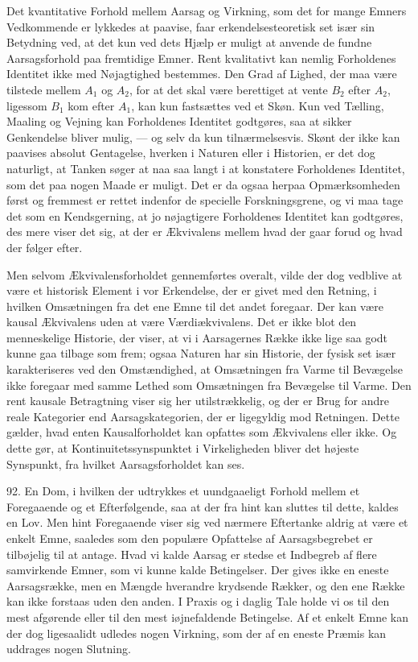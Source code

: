 \documentclass[12pt,a4paper]{book}
\newcommand{\apage}[1]{\marginnote{\footnotesize\textit{[#1]}}}
\begin{document}
Det kvantitative Forhold mellem Aarsag og Virkning, som det for mange Emners
Vedkommende er lykkedes at paavise, faar erkendelsesteoretisk set især sin
Betydning ved, at det kun ved dets Hjælp er muligt at anvende de fundne
Aarsagsforhold paa fremtidige Emner. Rent kvalitativt kan nemlig Forholdenes
Identitet ikke med Nøjagtighed bestemmes. Den Grad af Lighed, der maa være tilstede
mellem $A_1$ og $A_2$, for at det skal være berettiget at vente $B_2$ efter $A_2$,
ligessom $B_1$ kom efter $A_1$, kan kun fastsættes ved et Skøn. Kun ved Tælling,
Maaling og Vejning kan Forholdenes Identitet godtgøres, saa at sikker Genkendelse
bliver mulig, --- og selv da kun tilnærmelsesvis. Skønt der ikke kan paavises absolut
Gentagelse, hverken i Naturen eller i Historien, er det dog naturligt, at Tanken
søger at naa saa langt i at konstatere Forholdenes Identitet, som det paa nogen
Maade er muligt. Det er da ogsaa herpaa Opmærksomheden først og fremmest er rettet
indenfor de specielle \apage{215} Forskningsgrene, og vi maa tage det som en Kendsgerning, at
jo nøjagtigere Forholdenes Identitet kan godtgøres, des mere viser det sig, at der
er Ækvivalens mellem hvad der gaar forud og hvad der følger efter.

Men selvom Ækvivalensforholdet gennemførtes overalt, vilde der dog vedblive at
være et historisk Element i vor Erkendelse, der er givet med den Retning, i hvilken
Omsætningen fra det ene Emne til det andet foregaar. Der kan være kausal Ækvivalens
uden at være Værdiækvivalens. Det er ikke blot den menneskelige Historie, der
viser, at vi i Aarsagernes Række ikke lige saa godt kunne gaa tilbage som frem;
ogsaa Naturen har sin Historie, der fysisk set især karakteriseres ved den
Omstændighed, at Omsætningen fra Varme til Bevægelse ikke foregaar med samme Lethed
som Omsætningen fra Bevægelse til Varme. Den rent kausale Betragtning viser sig her
utilstrækkelig, og der er Brug for andre reale Kategorier end Aarsagskategorien,
der er ligegyldig mod Retningen. Dette gælder, hvad enten Kausalforholdet kan
opfattes som Ækvivalens eller ikke. Og dette gør, at Kontinuitetssynspunktet i
Virkeligheden bliver det højeste Synspunkt, fra hvilket Aarsagsforholdet kan ses.

92. En Dom, i hvilken der udtrykkes et uundgaaeligt Forhold mellem et Foregaaende
og et Efterfølgende, saa at der fra hint kan sluttes til dette, kaldes en Lov. Men
hint Foregaaende viser sig ved nærmere Eftertanke aldrig at være et enkelt Emne,
saaledes som den populære Opfattelse af Aarsagsbegrebet er tilbøjelig til at
antage. Hvad vi kalde Aarsag er stedse et Indbegreb af flere samvirkende Emner, som
vi kunne kalde Betingelser. Der gives ikke en eneste Aarsagsrække, men en Mængde
hverandre krydsende Rækker, og den ene Række kan ikke forstaas uden den anden. I
Praxis og i daglig Tale holde vi os til den mest afgørende eller til den mest
iøjnefaldende Betingelse. Af et enkelt Emne kan der dog ligesaalidt udledes nogen
Virkning, som der af en eneste Præmis kan uddrages nogen Slutning.
\end{document}
